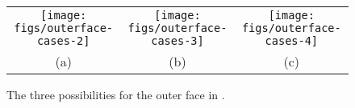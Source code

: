 \begin{figure*}
   \begin{center}\begin{tabular}{ccc}
      \texttt{[image: figs/outerface-cases-2]} & 
      \texttt{[image: figs/outerface-cases-3]} & 
      \texttt{[image: figs/outerface-cases-4]} \\
      (a) & (b) & (c)
   \end{tabular}\end{center}
   \caption{The three possibilities for the outer face in
     .
   }
\end{figure*} 

